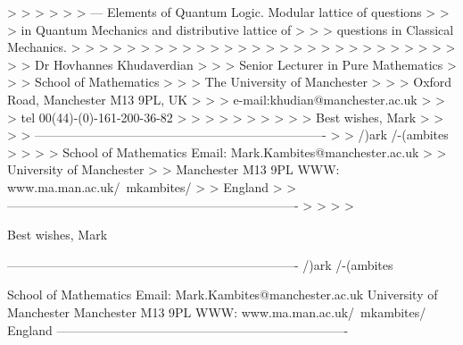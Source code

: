  > > >
 > > > --- Elements of Quantum Logic. Modular lattice of questions
 > > > in Quantum Mechanics and distributive lattice of
 > > > questions in  Classical Mechanics.
 > > >
 > > > %
 > > >
 > > >
 > > >
 > > >
 > > >
 > > >
 > > >
 > > >                             Dr Hovhannes Khudaverdian
 > > >                         Senior Lecturer in Pure Mathematics
 > > >                              School of Mathematics
 > > >                           The University of Manchester
 > > >                       Oxford Road, Manchester  M13 9PL, UK
 > > >                         e-mail:khudian@manchester.ac.uk
 > > >                          tel 00(44)-(0)-161-200-36-82
 > > >
 > > >
 > >
 > > Best wishes, Mark
 > >
 > > ----------------------------------------------------------------------
 > >  /\/)ark /-(ambites
 > >
 > >  School of Mathematics        Email: Mark.Kambites@manchester.ac.uk
 > >  University of Manchester
 > >  Manchester M13 9PL             WWW: www.ma.man.ac.uk/~mkambites/
 > >  England
 > > ----------------------------------------------------------------------
 > >
 > 
 > 

Best wishes, Mark

----------------------------------------------------------------------
  /\/)ark /-(ambites

  School of Mathematics        Email: Mark.Kambites@manchester.ac.uk
  University of Manchester
  Manchester M13 9PL             WWW: www.ma.man.ac.uk/~mkambites/
  England
----------------------------------------------------------------------

